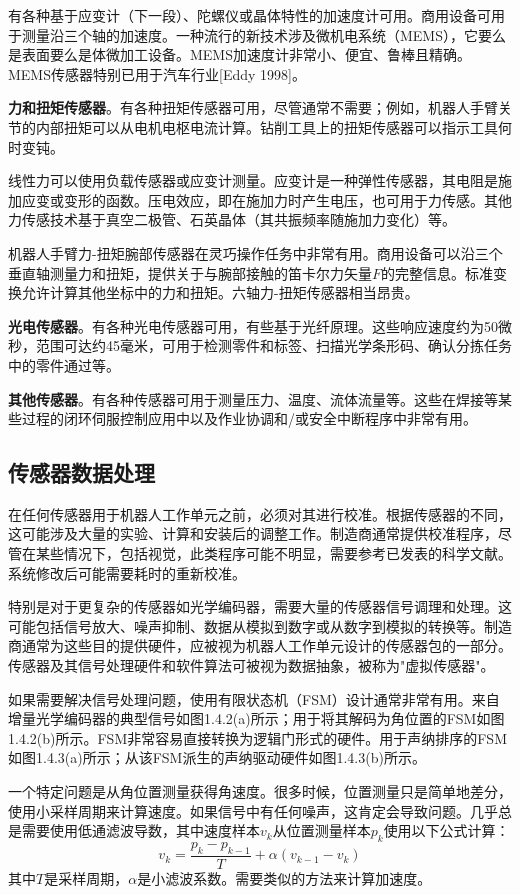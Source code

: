 \documentclass[UTF8,a4paper]{ctexart}
\begin{document}
有各种基于应变计（下一段）、陀螺仪或晶体特性的加速度计可用。商用设备可用于测量沿三个轴的加速度。一种流行的新技术涉及微机电系统（MEMS），它要么是表面要么是体微加工设备。MEMS加速度计非常小、便宜、鲁棒且精确。MEMS传感器特别已用于汽车行业[Eddy 1998]。

\textbf{力和扭矩传感器}。有各种扭矩传感器可用，尽管通常不需要；例如，机器人手臂关节的内部扭矩可以从电机电枢电流计算。钻削工具上的扭矩传感器可以指示工具何时变钝。

线性力可以使用负载传感器或应变计测量。应变计是一种弹性传感器，其电阻是施加应变或变形的函数。压电效应，即在施加力时产生电压，也可用于力传感。其他力传感技术基于真空二极管、石英晶体（其共振频率随施加力变化）等。

机器人手臂力-扭矩腕部传感器在灵巧操作任务中非常有用。商用设备可以沿三个垂直轴测量力和扭矩，提供关于与腕部接触的笛卡尔力矢量$F$的完整信息。标准变换允许计算其他坐标中的力和扭矩。六轴力-扭矩传感器相当昂贵。

\textbf{光电传感器}。有各种光电传感器可用，有些基于光纤原理。这些响应速度约为50微秒，范围可达约45毫米，可用于检测零件和标签、扫描光学条形码、确认分拣任务中的零件通过等。

\textbf{其他传感器}。有各种传感器可用于测量压力、温度、流体流量等。这些在焊接等某些过程的闭环伺服控制应用中以及作业协调和/或安全中断程序中非常有用。

\subsection{传感器数据处理}

在任何传感器用于机器人工作单元之前，必须对其进行校准。根据传感器的不同，这可能涉及大量的实验、计算和安装后的调整工作。制造商通常提供校准程序，尽管在某些情况下，包括视觉，此类程序可能不明显，需要参考已发表的科学文献。系统修改后可能需要耗时的重新校准。

特别是对于更复杂的传感器如光学编码器，需要大量的传感器信号调理和处理。这可能包括信号放大、噪声抑制、数据从模拟到数字或从数字到模拟的转换等。制造商通常为这些目的提供硬件，应被视为机器人工作单元设计的传感器包的一部分。传感器及其信号处理硬件和软件算法可被视为数据抽象，被称为"虚拟传感器"。

如果需要解决信号处理问题，使用有限状态机（FSM）设计通常非常有用。来自增量光学编码器的典型信号如图1.4.2(a)所示；用于将其解码为角位置的FSM如图1.4.2(b)所示。FSM非常容易直接转换为逻辑门形式的硬件。用于声纳排序的FSM如图1.4.3(a)所示；从该FSM派生的声纳驱动硬件如图1.4.3(b)所示。

一个特定问题是从角位置测量获得角速度。很多时候，位置测量只是简单地差分，使用小采样周期来计算速度。如果信号中有任何噪声，这肯定会导致问题。几乎总是需要使用低通滤波导数，其中速度样本$v_k$从位置测量样本$p_k$使用以下公式计算：
\[
v_k = \frac{p_k - p_{k-1}}{T} + \alpha (v_{k-1} - v_k)
\]
其中$T$是采样周期，$\alpha$是小滤波系数。需要类似的方法来计算加速度。
\end{document}
